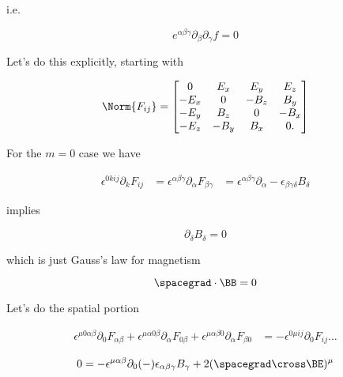 i.e.

\begin{equation}\label{eqn:relativisticElectrodynamicsL11:810}
e^{\alpha\beta\gamma} \partial_\beta \partial_\gamma f = 0
\end{equation}

Let's do this explicitly, starting with

\begin{equation}\label{eqn:relativisticElectrodynamicsL10:370}
\Norm{ F_{ij} } = 
\begin{bmatrix}
0 & E_x & E_y & E_z \\
-E_x & 0 & -B_z & B_y \\
-E_y & B_z & 0 & -B_x \\
-E_z & -B_y & B_x & 0.
\end{bmatrix}
\end{equation}

For the $m= 0$ case we have

\begin{align*}
\epsilon^{0 k i j} \partial_k F_{ij}
&=
\epsilon^{\alpha \beta \gamma} \partial_\alpha F_{\beta \gamma}
&= 
\epsilon^{\alpha \beta \gamma} \partial_\alpha -\epsilon_{\beta \gamma \delta} B_\delta
\end{align*}

implies

\begin{equation}\label{eqn:relativisticElectrodynamicsL11:830}
\partial_\delta B_\delta = 0
\end{equation}

which is just Gauss's law for magnetism

\begin{equation}\label{eqn:relativisticElectrodynamicsL11:850}
\spacegrad \cdot \BB = 0
\end{equation}

Let's do the spatial portion

\begin{align*}
\epsilon^{\mu 0 \alpha \beta} \partial_0 F_{\alpha \beta}
+\epsilon^{\mu \alpha 0 \beta} \partial_\alpha F_{0 \beta}
+\epsilon^{\mu \alpha \beta 0} \partial_\alpha F_{\beta 0}
&= -
\epsilon^{0 \mu i j} \partial_0 F_{ij}
...
\end{align*}

\begin{equation}\label{eqn:relativisticElectrodynamicsL11:870}
0 = -\epsilon^{\mu \alpha \beta} \partial_0 (-) \epsilon_{\alpha \beta \gamma} B_\gamma + 2 (\spacegrad \cross \BE)^\mu
\end{equation}

